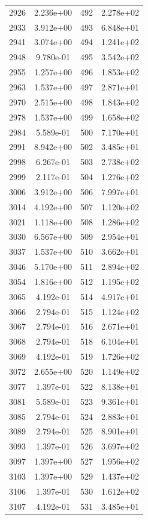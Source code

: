 \documentclass[12pt]{article}
\begin{document}
\begin{longtable}{@{}cccc@{}}
2926 & 2.236e+00 & 492 & 2.278e+02 \\
2933 & 3.912e+00 & 493 & 6.848e+01 \\
2941 & 3.074e+00 & 494 & 1.241e+02 \\
2948 & 9.780e-01 & 495 & 3.542e+02 \\
2955 & 1.257e+00 & 496 & 1.853e+02 \\
2963 & 1.537e+00 & 497 & 2.871e+01 \\
2970 & 2.515e+00 & 498 & 1.843e+02 \\
2978 & 1.537e+00 & 499 & 1.658e+02 \\
2984 & 5.589e-01 & 500 & 7.170e+01 \\
2991 & 8.942e+00 & 502 & 3.485e+01 \\
2998 & 6.267e-01 & 503 & 2.738e+02 \\
2999 & 2.117e-01 & 504 & 1.276e+02 \\
3006 & 3.912e+00 & 506 & 7.997e+01 \\
3014 & 4.192e+00 & 507 & 1.120e+02 \\
3021 & 1.118e+00 & 508 & 1.286e+02 \\
3030 & 6.567e+00 & 509 & 2.954e+01 \\
3037 & 1.537e+00 & 510 & 3.662e+01 \\
3046 & 5.170e+00 & 511 & 2.894e+02 \\
3054 & 1.816e+00 & 512 & 1.195e+02 \\
3065 & 4.192e-01 & 514 & 4.917e+01 \\
3066 & 2.794e-01 & 515 & 1.124e+02 \\
3067 & 2.794e-01 & 516 & 2.671e+01 \\
3068 & 2.794e-01 & 518 & 6.104e+01 \\
3069 & 4.192e-01 & 519 & 1.726e+02 \\
3072 & 2.655e+00 & 520 & 1.149e+02 \\
3077 & 1.397e-01 & 522 & 8.138e+01 \\
3081 & 5.589e-01 & 523 & 9.361e+01 \\
3085 & 2.794e-01 & 524 & 2.883e+01 \\
3089 & 2.794e-01 & 525 & 8.901e+01 \\
3093 & 1.397e-01 & 526 & 3.697e+02 \\
3097 & 1.397e+00 & 527 & 1.956e+02 \\
3103 & 1.397e+00 & 529 & 1.437e+02 \\
3106 & 1.397e-01 & 530 & 1.612e+02 \\
3107 & 4.192e-01 & 531 & 3.485e+01 \\

\end{longtable}
\end{document}
